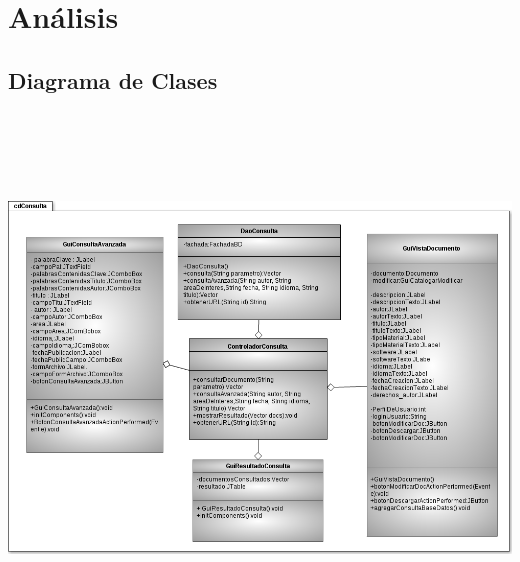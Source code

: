 \documentclass[]{article}
\begin{document}
                        
                        
                        
                        
                        
                        
                        
                        
                        
                        
                        
                        
                        
                        
                        
                        
                        
                        
 
\section{Análisis}
		\subsection{Diagrama de Clases}
			\begin{minipage}[c]{1\linewidth}
				\centering
				\includegraphics[width=17cm, height=14cm]{DiagramasClase/Consultas}
			\end{minipage}	
		
\end{document}
